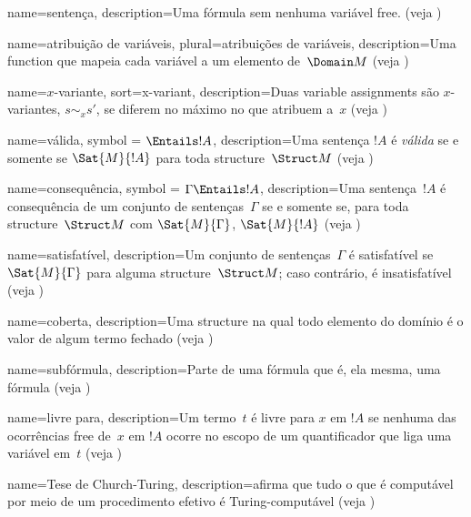  {
  name=sentença,  
  description={Uma {fórmula} sem nenhuma variável \gls{free}. (veja
    )} }

 {
  name=atribuição de variáveis,
  plural={atribuições de variáveis},
  description={Uma \gls{function} que mapeia cada {variável} a um elemento
    de~$\Domain M$ (veja )} }

 {
  name=$x$-variante,
  sort={x-variant},
  description={Duas \glspl{variable assignment} são $x$-variantes, $s \sim_x
    s'$, se diferem no máximo no que atribuem a~$x$ (veja
    )} }

 {
  name=válida,
  symbol = {\ensuremath{\Entails !A}},
  description={Uma sentença $!A$ é \emph{válida} se e somente se
    $\Sat{M}{!A}$ para toda \gls{structure}~$\Struct M$ (veja
    )} }

 {
  name=consequência,
  symbol = {\ensuremath{\Gamma \Entails !A}},
  description={Uma sentença~$!A$ é consequência de um conjunto de
    sentenças~$\Gamma$ se e somente se, para toda
    \gls{structure}~$\Struct M$ com $\Sat{M}{\Gamma}$, $\Sat{M}{!A}$
    (veja )} }

 {
  name=satisfatível,
  description={Um conjunto de sentenças~$\Gamma$ é satisfatível se
    $\Sat{M}{\Gamma}$ para alguma \gls{structure}~$\Struct M$; caso contrário, é
    insatisfatível (veja )} }

 {
    name=coberta,    
    description={Uma \gls{structure} na qual todo elemento do
      domínio é o {valor} de algum termo fechado (veja
      )} }

 {
  name={subfórmula},  
  description={Parte de uma fórmula que é, ela mesma, uma fórmula (veja
    )} }

 {
  name=livre para,
  description={Um termo~$t$ é {livre para} $x$ em $!A$ se nenhuma
    das ocorrências \gls{free} de~$x$ em $!A$ ocorre no escopo de um
    quantificador que liga uma variável em~$t$ (veja
    )} }

 {
  name=Tese de Church-Turing,
  description={afirma que tudo o que é computável por meio de um procedimento
    efetivo é Turing-computável (veja )} }

